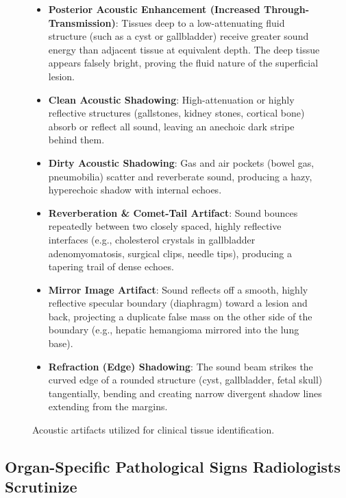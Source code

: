 \documentclass[11pt,a4paper]{article}
\begin{document}
\begin{figure}[htbp]
\centering
\begin{tcolorbox}[colback=teal!5!white,colframe=teal!75!black,arc=1mm,title=\sffamily Key Diagnostic Ultrasound Artifacts]
\small
\begin{itemize}
    \item \textbf{Posterior Acoustic Enhancement (Increased Through-Transmission)}: Tissues deep to a low-attenuating fluid structure (such as a cyst or gallbladder) receive greater sound energy than adjacent tissue at equivalent depth. The deep tissue appears falsely bright, proving the fluid nature of the superficial lesion.
    \item \textbf{Clean Acoustic Shadowing}: High-attenuation or highly reflective structures (gallstones, kidney stones, cortical bone) absorb or reflect all sound, leaving an anechoic dark stripe behind them.
    \item \textbf{Dirty Acoustic Shadowing}: Gas and air pockets (bowel gas, pneumobilia) scatter and reverberate sound, producing a hazy, hyperechoic shadow with internal echoes.
    \item \textbf{Reverberation \& Comet-Tail Artifact}: Sound bounces repeatedly between two closely spaced, highly reflective interfaces (e.g., cholesterol crystals in gallbladder adenomyomatosis, surgical clips, needle tips), producing a tapering trail of dense echoes.
    \item \textbf{Mirror Image Artifact}: Sound reflects off a smooth, highly reflective specular boundary (diaphragm) toward a lesion and back, projecting a duplicate false mass on the other side of the boundary (e.g., hepatic hemangioma mirrored into the lung base).
    \item \textbf{Refraction (Edge) Shadowing}: The sound beam strikes the curved edge of a rounded structure (cyst, gallbladder, fetal skull) tangentially, bending and creating narrow divergent shadow lines extending from the margins.
\end{itemize}
\end{tcolorbox}
\caption{Acoustic artifacts utilized for clinical tissue identification.}
\label{fig:ultrasound_artifacts}
\end{figure}

\subsection{Organ-Specific Pathological Signs Radiologists Scrutinize}
\end{document}
